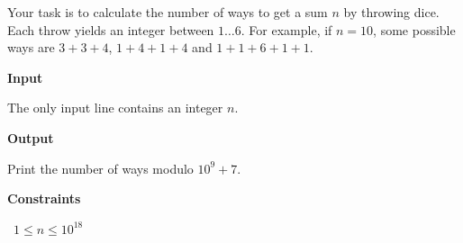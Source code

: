 Your task is to calculate the number of ways to get a sum $n$ by throwing dice. Each throw yields an integer between $1 \ldots 6$.
For example, if $n=10$, some possible ways are $3+3+4$, $1+4+1+4$ and $1+1+6+1+1$.

\vspace{0.3cm}\noindent\textbf{Input}

The only input line contains an integer $n$.

\vspace{0.3cm}\noindent\textbf{Output}

Print the number of ways modulo $10^9+7$.

\vspace{0.3cm}\noindent\textbf{Constraints}

\textbullet\ $1 \le n \le 10^{18}$
